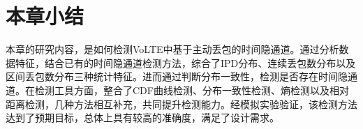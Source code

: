 \section{本章小结}
\label{chap:analyze:summary}

本章的研究内容，是如何检测VoLTE中基于主动丢包的时间隐通道。通过分析数据特征，结合已有的时间隐通道检测方法，综合了IPD分布、连续丢包数分布以及区间丢包数分布三种统计特征。进而通过判断分布一致性，检测是否存在时间隐通道。在检测工具方面，整合了CDF曲线检测、分布一致性检测、熵检测以及相对距离检测，几种方法相互补充，共同提升检测能力。经模拟实验验证，该检测方法达到了预期目标，总体上具有较高的准确度，满足了设计需求。
